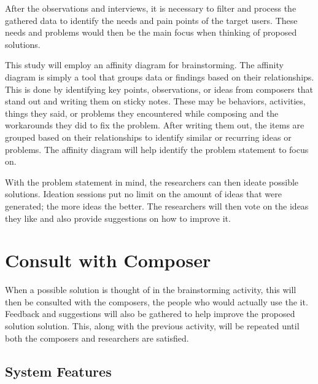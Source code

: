 		After the observations and interviews, it is necessary to filter and process the gathered data to identify the needs and pain points of the target users. These needs and problems would then be the main focus when thinking of proposed solutions. 

		This study will employ an affinity diagram for brainstorming. The affinity diagram is simply a tool that groups data or findings based on their relationships. This is done by identifying key points, observations, or ideas from composers that stand out and writing them on sticky notes. These may be behaviors, activities, things they said, or problems they encountered while composing and the workarounds they did to fix the problem. After writing them out, the items are grouped based on their relationships to identify similar or recurring ideas or problems. The affinity diagram will help identify the problem statement to focus on.

		With the problem statement in mind, the researchers can then ideate possible solutions. Ideation sessions put no limit on the amount of ideas that were generated; the more ideas the better. The researchers will then vote on the ideas they like and also provide suggestions on how to improve it. 

	\section{Consult with Composer}

		When a possible solution is thought of in the brainstorming activity, this will then be consulted with the composers, the people who would actually use the it. Feedback and suggestions will also be gathered to help improve the proposed solution solution. This, along with the previous activity, will be repeated until both the composers and researchers are satisfied.

		\subsection{System Features}

